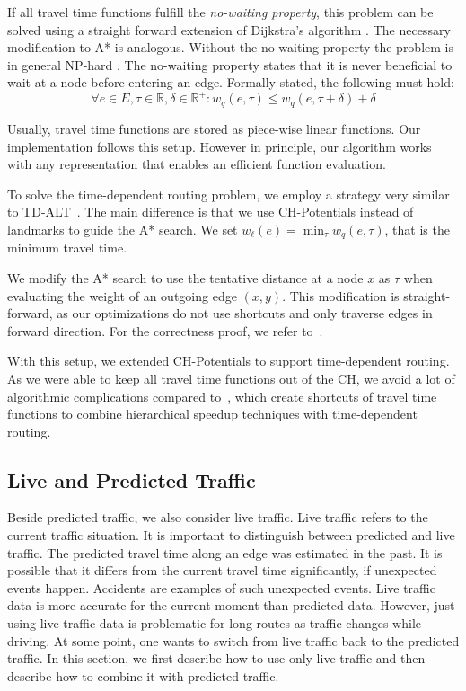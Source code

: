 \documentclass[letterpaper]{article} %
\begin{document}
If all travel time functions fulfill the \emph{no-waiting property}, this problem can be solved using a straight forward extension of Dijkstra's algorithm \cite{d-aassp-69}.
The necessary modification to A* is analogous.
Without the no-waiting property the problem is in general NP-hard \cite{or-tnp-89}.
The no-waiting property states that it is never beneficial to wait at a node before entering an edge.
Formally stated, the following must hold:\[
\forall e\in E,\tau\in \mathbb{R},\delta\in \mathbb{R}^+: w_q(e, \tau) \le w_q(e, \tau+\delta) + \delta
\]

Usually, travel time functions are stored as piece-wise linear functions.
Our implementation follows this setup.
However in principle, our algorithm works with any representation that enables an efficient function evaluation.

To solve the time-dependent routing problem, we employ a strategy very similar to TD-ALT~\cite{ndls-bastd-12}.
The main difference is that we use CH-Potentials instead of landmarks to guide the A* search.
We set $w_\ell(e) = \min_\tau w_q(e,\tau)$, that is the minimum travel time.

We modify the A* search to use the tentative distance at a node $x$ as $\tau$ when evaluating the weight of an outgoing edge $(x,y)$.
This modification is straight-forward, as our optimizations do not use shortcuts and only traverse edges in forward direction.
For the correctness proof, we refer to~\cite{dw-lbrdg-07}.

With this setup, we extended CH-Potentials to support time-dependent routing.
As we were able to keep all travel time functions out of the CH, we avoid a lot of algorithmic complications compared to~\cite{bgsv-mtdtt-13,bdpw-dtdrp-16,swz-sfert-19}, which create shortcuts of travel time functions to combine hierarchical speedup techniques with time-dependent routing.

\subsection{Live and Predicted Traffic}
\label{sec:live-predicted-traffic}

Beside predicted traffic, we also consider live traffic.
Live traffic refers to the current traffic situation.
It is important to distinguish between predicted and live traffic.
The predicted travel time along an edge was estimated in the past.
It is possible that it differs from the current travel time significantly, if unexpected events happen.
Accidents are examples of such unexpected events.
Live traffic data is more accurate for the current moment than predicted data.
However, just using live traffic data is problematic for long routes as traffic changes while driving.
At some point, one wants to switch from live traffic back to the predicted traffic.
In this section, we first describe how to use only live traffic and then describe how to combine it with predicted traffic.
\end{document}
